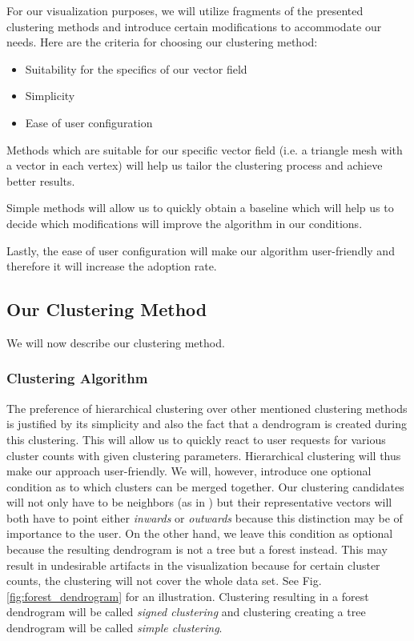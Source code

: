 For our visualization purposes, we will utilize fragments of the presented clustering methods and introduce certain modifications to accommodate our needs. Here are the criteria for choosing our clustering method:

\begin{itemize}
\item Suitability for the specifics of our vector field
\item Simplicity
\item Ease of user configuration
\end{itemize}

Methods which are suitable for our specific vector field (i.e. a triangle mesh with a vector in each vertex) will help us tailor the clustering process and achieve better results. 

Simple methods will allow us to quickly obtain a baseline which will help us to decide which modifications will improve the algorithm in our conditions. 

Lastly, the ease of user configuration will make our algorithm user-friendly and therefore it will increase the adoption rate.

\subsection{Our Clustering Method}

We will now describe our clustering method.

\subsubsection{Clustering Algorithm}
\label{sec:analysis_clustering_algorithm}

The preference of hierarchical clustering over other mentioned clustering methods is justified by its simplicity and also the fact that a dendrogram is created during this clustering. This will allow us to quickly react to user requests for various cluster counts with given clustering parameters. Hierarchical clustering will thus make our approach user-friendly. We will, however, introduce one optional condition as to which clusters can be merged together. Our clustering candidates will not only have to be neighbors (as in \citet{Telea99}) but their representative vectors will both have to point either {\it inwards} or {\it outwards} because this distinction may be of importance to the user. On the other hand, we leave this condition as optional because the resulting dendrogram is not a tree but a forest instead. This may result in undesirable artifacts in the visualization because for certain cluster counts, the clustering will not cover the whole data set. See Fig. \ref{fig:forest_dendrogram} for an illustration. Clustering resulting in a forest dendrogram will be called {\it signed clustering} and clustering creating a tree dendrogram will be called {\it simple clustering}.

